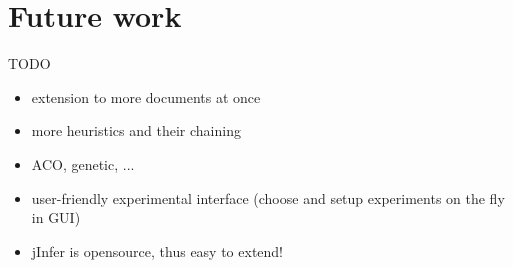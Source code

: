 \chapter{Future work}

TODO

\begin{itemize}
  \item extension to more documents at once
  \item more heuristics and their chaining
  \item ACO, genetic, ...
  \item user-friendly experimental interface (choose and setup experiments on the fly in GUI)
  \item jInfer is opensource, thus easy to extend!
\end{itemize}
